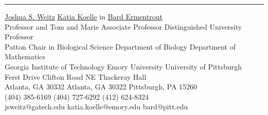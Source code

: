 \documentclass[a4paper,10pt]{article}
\newlength{\cvcolumngapwidth}
\newlength{\cvleftcolumnwidth}
\newlength{\cvrightcolumnwidth}
\newcommand{\cvsectionstyle}[1]{{\normalsize\cvsectionfont\textcolor{cvsectioncolor}{#1}}}
\newlength{\cvaftersectionskipamount}
\newcommand{\cvsection}[1]{
            \begin{minipage}[t]{\cvleftcolumnwidth}
                \raggedleft\cvsectionstyle{#1}
            \end{minipage}%
            \hspace{\cvcolumngapwidth}%
            \begin{minipage}[t]{\cvrightcolumnwidth}
                \textcolor{cvrulecolor}{\rule{\cvrightcolumnwidth}{0.3mm}}
            \end{minipage}
        
            \vspace{\cvaftersectionskipamount}
        }
\begin{document}
        
        \cvsection{REFERENCES}
        
        \begin{tabbing}
        \hskip 1in \= \href{http://weitzgroup.biosci.gatech.edu/}{Joshua S. Weitz}              \hskip 1.25in \= \href{https://scholarblogs.emory.edu/koellelab/}{Katia Koelle}      in \= \href{https://www.pitt.edu/~phase/}{Bard Ermentrout} \\    
        \>  Professor and Tom and Marie 										\> Associate Professor								\> Distinguished University Professor \\	
        \> Patton Chair in Biological Science	           										\> Department of Biology         			        				\> Department of Mathematics	\\
        \> Georgia Institute of Technology	            									\> Emory University	    					       			\> University of Pittsburgh \\
         Ferst Drive                												 Clifton Road NE				                 		 Thackeray Hall \\
        \> Atlanta, GA 30332														\> Atlanta, GA 30322		                     					\> Pittsburgh, PA  15260  \\
        \> (404) 385-6169														\> (404) 727-6292        			                 			\> (412) 624-8324   \\   
        \> jsweitz@gatech.edu													\> katia.koelle@emory.edu                       	    				\> bard@pitt.edu   \\
        \end{tabbing}
        
        
\end{document}
